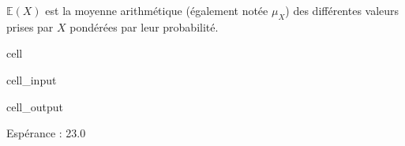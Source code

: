 \documentclass[letterpaper,10pt,english]{jupyterBook}
\begin{document}
\sphinxAtStartPar
\(\mathbb E(X)\) est la moyenne arithmétique (également notée \(\mu_X\)) des différentes valeurs prises par \(X\) pondérées par leur probabilité.

\begin{sphinxuseclass}{cell}\begin{sphinxVerbatimInput}

\begin{sphinxuseclass}{cell_input}
\begin{sphinxVerbatim}[commandchars=\\\{\}]
   
  \PYG{p}{[}  \PYG{p}{]}
  \PYG{p}{[}  \PYG{p}{]}
   
 
\end{sphinxVerbatim}

\end{sphinxuseclass}\end{sphinxVerbatimInput}
\begin{sphinxVerbatimOutput}

\begin{sphinxuseclass}{cell_output}
\begin{sphinxVerbatim}[commandchars=\\\{\}]
Espérance :  23.0
\end{sphinxVerbatim}

\end{sphinxuseclass}\end{sphinxVerbatimOutput}

\end{sphinxuseclass}
\end{document}
